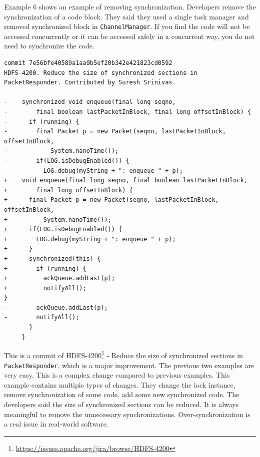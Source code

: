 Example 6 shows an example of removing synchronization. Developers remove the synchronization of a code block. They said they used a single task manager and removed synchronized block in \texttt{ChannelManager}. If you find the code will not be accessed concurrently or it can be accessed safely in a concurrent way, you do not need to synchronize the code.

\begin{lstlisting}
commit 7e56bfe40589a1aa9b5ef20b342e421823cd0592
HDFS-4200. Reduce the size of synchronized sections in PacketResponder. Contributed by Suresh Srinivas.

-    synchronized void enqueue(final long seqno,
-        final boolean lastPacketInBlock, final long offsetInBlock) {
-      if (running) {
-        final Packet p = new Packet(seqno, lastPacketInBlock, offsetInBlock,
-            System.nanoTime());
-        if(LOG.isDebugEnabled()) {
-          LOG.debug(myString + ": enqueue " + p);
+    void enqueue(final long seqno, final boolean lastPacketInBlock,
+        final long offsetInBlock) {
+      final Packet p = new Packet(seqno, lastPacketInBlock, offsetInBlock,
+          System.nanoTime());
+      if(LOG.isDebugEnabled()) {
+        LOG.debug(myString + ": enqueue " + p);
+      }
+      synchronized(this) {
+        if (running) {
+          ackQueue.addLast(p);
+          notifyAll();
}
-        ackQueue.addLast(p);
-        notifyAll();
       }
     }
\end{lstlisting}

This is a commit of HDFS-4200\footnote{\url{https://issues.apache.org/jira/browse/HDFS-4200}} - Reduce the size of synchronized sections in \texttt{PacketResponder}, which is a major improvement. The previous two examples are very easy. This is a complex change compared to previous examples. This example contains multiple types of changes. They change the lock instance, remove synchronization of some code, add some new synchronized code. The developers said the size of synchronized sections can be reduced. It is always meaningful to remove the unnecessary synchronizations. Over-synchronization \cite{conf/sigsoft/GuJSZL15} is a real issue in real-world software.


